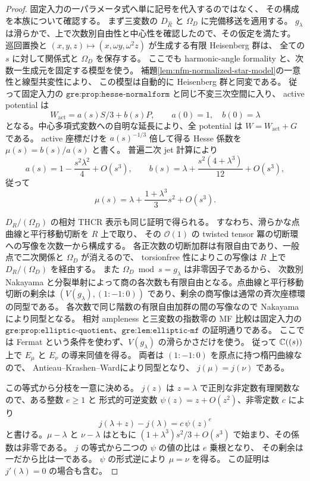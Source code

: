 \begin{proof}
固定入力の一パラメータ式へ単に記号を代入するのではなく、
その構成を本族について確認する。
まず三変数の $D_{\widehat R}$ と $\Omega_D$ に完備移送を適用する。
$g_\lambda$ は滑らかで、上で次数別自由性と中心性を確認したので、その仮定を満たす。
巡回置換と $(x,y,z)\mapsto(x,\omega y,\omega^2z)$ が生成する有限 Heisenberg 群は、
全ての $s$ に対して関係式と $\Omega_D$ を保存する。
ここでも harmonic-angle formality と、次数一生成元を固定する模型を使う。
補題\ref{lem:nfm-normalized-star-model}の一意性と線型共変性により、
この模型は自動的に Heisenberg 群と同変である。
従って固定入力の $\texttt{gre:prop:hesse-normalform}$ と同じ不変三次空間に入り、
active potential は
\[
 W_{\mathrm{act}}=a(s)S/3+b(s)P,
 \qquad a(0)=1,\quad b(0)=\lambda
\]
となる。中心多項式変数への自明な延長により、全 potential は
$W=W_{\mathrm{act}}+G$ である。
active 座標だけを $a(s)^{-1/3}$ 倍して得る Hesse 係数を
$\mu(s)=b(s)/a(s)$ と書く。
普遍二次 jet 計算により
\[
 a(s)=1-\frac{s^2\lambda^2}{4}+O(s^3),\qquad
 b(s)=\lambda+\frac{s^2(4+\lambda^3)}{12}+O(s^3),
\]
従って
\[
 \mu(s)=\lambda+\frac{1+\lambda^3}{3}s^2+O(s^3).
\]

$D_R/(\Omega_D)$ の相対 THCR 表示も同じ証明で得られる。
すなわち、滑らかな点曲線と平行移動切断を $R$ 上で取り、
その $\mathcal O(1)$ の twisted tensor 冪の切断環への写像を次数一から構成する。
各正次数の切断加群は有限自由であり、一般点で二次関係と $\Omega_D$ が消えるので、
torsionfree 性によりこの写像は $R$ 上で $D_R/(\Omega_D)$ を経由する。
また $\Omega_D\bmod s=g_\lambda$ は非零因子であるから、
次数別 Nakayama と分裂単射によって商の各次数も有限自由となる。点曲線と平行移動切断の剰余は
$(V(g_\lambda),(1:-1:0))$ であり、剰余の商写像は通常の斉次座標環の同型である。
各次数で同じ階数の有限自由加群の間の写像なので Nakayama により同型となる。
相対 ampleness と三変数の指数零の MF 比較は固定入力の
$\texttt{gre:prop:elliptic-quotient}$、$\texttt{gre:lem:elliptic-mf}$ の証明通りである。
ここでは Fermat という条件を使わず、$V(g_\lambda)$ の滑らかさだけを使う。
従って $\mathbb C((s))$ 上で $E_\mu$ と $E_\nu$ の導来同値を得る。
両者は $(1:-1:0)$ を原点に持つ楕円曲線なので、
Antieau--Krashen--Ward\cite[Theorem~2.2]{NFMAKW}により同型となり、
$j(\mu)=j(\nu)$ である。

この等式から分枝を一意に決める。
$j(z)$ は $z=\lambda$ で正則な非定数有理関数なので、ある整数 $e\ge1$ と
形式的可逆変数 $\psi(z)=z+O(z^2)$、非零定数 $c$ により
\[
 j(\lambda+z)-j(\lambda)=c\,\psi(z)^e
\]
と書ける。$\mu-\lambda$ と $\nu-\lambda$ はともに
$(1+\lambda^3)s^2/3+O(s^3)$ で始まり、その係数は非零である。
$j$ の等式から二つの $\psi$ の値の比は $e$ 乗根となり、
その剰余は一だから比は一である。
$\psi$ の形式逆により $\mu=\nu$ を得る。
この証明は $j'(\lambda)=0$ の場合も含む。


\end{proof}
